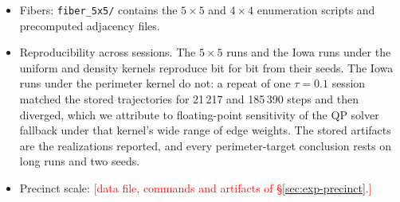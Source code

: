 \documentclass[11pt]{article}
\newcommand{\todo}[1]{\textcolor{red}{[#1]}}
\begin{document}
\begin{itemize}
    stamped with its configuration: \texttt{target\_matched\_*.npz},
    \texttt{long\_run\_5x5\_seed42.npz}, \texttt{matrix\_tree\_targets.npz},
    \texttt{calibration\_distance\_seed42.npz},
    \texttt{long\_run\_2x3\_n*\_seed42.npz},
    \texttt{spectral\_move\_size.npz}, \texttt{acceptance\_sweep\_5x5.npz},
    \texttt{mobility\_law\_5x5.npz}, \texttt{hybrid\_*.npz},
    \texttt{forest\_validate\_5x5\_*.npz}, \texttt{forest\_iowa\_*.npz},
    \texttt{forest\_verdict.txt}, \texttt{forest\_scaling\_seed42*.npz},
    with the console logs beside them.
  \item Fibers: \texttt{fiber\_5x5/} contains the $5 \times 5$ and
    $4 \times 4$ enumeration scripts and precomputed
    adjacency files.
  \item Reproducibility across sessions. The $5 \times 5$ runs and the
    Iowa runs under the uniform and density kernels reproduce bit for
    bit from their seeds. The Iowa runs under the perimeter kernel do
    not: a repeat of one $\tau = 0.1$ session matched the stored
    trajectories for 21\,217 and 185\,390 steps and then diverged,
    which we attribute to floating-point sensitivity of the QP solver
    fallback under that kernel's wide range of edge weights. The
    stored artifacts are the realizations reported, and every
    perimeter-target conclusion rests on long runs and two seeds.
  \item Precinct scale: \todo{data file, commands and artifacts of
    \S\ref{sec:exp-precinct}.}
\end{itemize}
\endgroup



\end{document}
